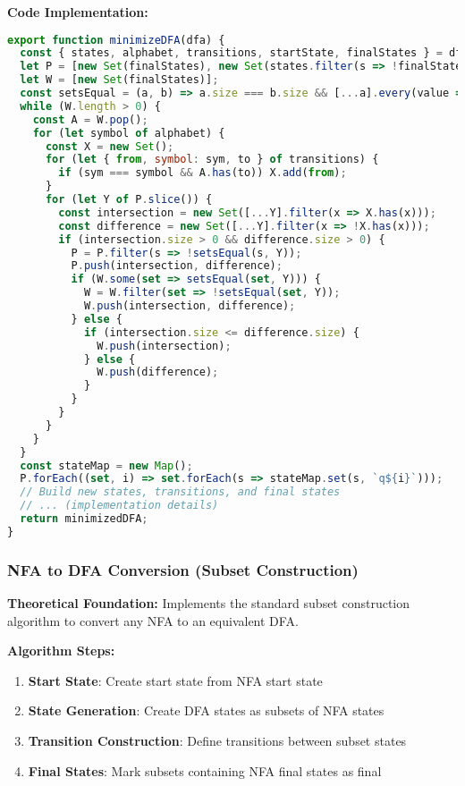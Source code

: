 \documentclass[12pt]{article}
\begin{document}
\textbf{Code Implementation:}
\begin{lstlisting}[language=JavaScript]
export function minimizeDFA(dfa) {
  const { states, alphabet, transitions, startState, finalStates } = dfa;
  let P = [new Set(finalStates), new Set(states.filter(s => !finalStates.includes(s)))];
  let W = [new Set(finalStates)];
  const setsEqual = (a, b) => a.size === b.size && [...a].every(value => b.has(value));
  while (W.length > 0) {
    const A = W.pop();
    for (let symbol of alphabet) {
      const X = new Set();
      for (let { from, symbol: sym, to } of transitions) {
        if (sym === symbol && A.has(to)) X.add(from);
      }
      for (let Y of P.slice()) {
        const intersection = new Set([...Y].filter(x => X.has(x)));
        const difference = new Set([...Y].filter(x => !X.has(x)));
        if (intersection.size > 0 && difference.size > 0) {
          P = P.filter(s => !setsEqual(s, Y));
          P.push(intersection, difference);
          if (W.some(set => setsEqual(set, Y))) {
            W = W.filter(set => !setsEqual(set, Y));
            W.push(intersection, difference);
          } else {
            if (intersection.size <= difference.size) {
              W.push(intersection);
            } else {
              W.push(difference);
            }
          }
        }
      }
    }
  }
  const stateMap = new Map();
  P.forEach((set, i) => set.forEach(s => stateMap.set(s, `q${i}`)));
  // Build new states, transitions, and final states
  // ... (implementation details)
  return minimizedDFA;
}
\end{lstlisting}

\subsubsection{NFA to DFA Conversion (Subset Construction)}
\textbf{Theoretical Foundation:} Implements the standard subset construction algorithm to convert any NFA to an equivalent DFA.

\textbf{Algorithm Steps:}
\begin{enumerate}
    \item \textbf{Start State}: Create start state from NFA start state
    \item \textbf{State Generation}: Create DFA states as subsets of NFA states
    \item \textbf{Transition Construction}: Define transitions between subset states
    \item \textbf{Final States}: Mark subsets containing NFA final states as final
\end{enumerate}
\end{document}
